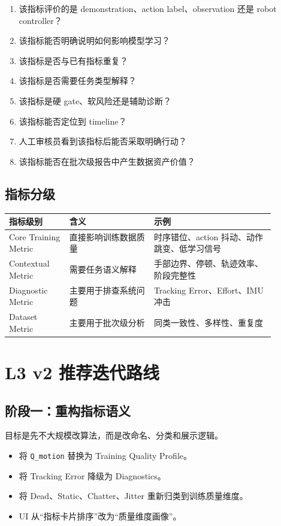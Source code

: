 \documentclass[UTF8,zihao=-4]{ctexart}
\begin{document}
\begin{enumerate}
  \item 该指标评价的是 demonstration、action label、observation 还是 robot controller？
  \item 该指标能否明确说明如何影响模型学习？
  \item 该指标是否与已有指标重复？
  \item 该指标是否需要任务类型解释？
  \item 该指标是硬 gate、软风险还是辅助诊断？
  \item 该指标能否定位到 timeline？
  \item 人工审核员看到该指标后能否采取明确行动？
  \item 该指标能否在批次级报告中产生数据资产价值？
\end{enumerate}

\subsection{指标分级}

\begin{longtable}{p{0.2\linewidth}p{0.28\linewidth}p{0.4\linewidth}}
\toprule
\textbf{指标级别} & \textbf{含义} & \textbf{示例} \\
\midrule
Core Training Metric & 直接影响训练数据质量 & 时序错位、action 抖动、动作跳变、低学习信号 \\
Contextual Metric & 需要任务语义解释 & 手部边界、停顿、轨迹效率、阶段完整性 \\
Diagnostic Metric & 主要用于排查系统问题 & Tracking Error、Effort、IMU 冲击 \\
Dataset Metric & 主要用于批次级分析 & 同类一致性、多样性、重复度 \\
\bottomrule
\end{longtable}

\section{L3 v2 推荐迭代路线}

\subsection{阶段一：重构指标语义}

目标是先不大规模改算法，而是改命名、分类和展示逻辑。

\begin{itemize}
  \item 将 \texttt{Q\_motion} 替换为 Training Quality Profile。
  \item 将 Tracking Error 降级为 Diagnostics。
  \item 将 Dead、Static、Chatter、Jitter 重新归类到训练质量维度。
  \item UI 从“指标卡片排序”改为“质量维度画像”。
\end{itemize}
\end{document}
